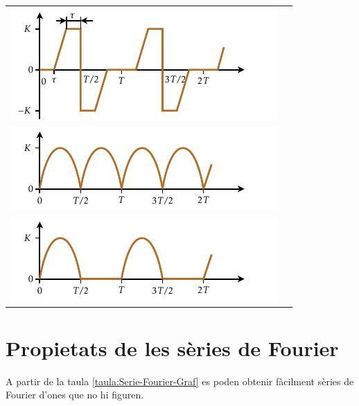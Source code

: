 \begin{longtable}{cc}
   \includegraphics{Imatges/Cap-Fourier-Funcio-12.pdf} & \raisebox{1.2cm}{$\displaystyle\frac{{2K}}{\piup }\sum\limits_{n = 1}^\infty  {\left( {1 + \frac{{\big(1 + ( - 1)^n \big)\sin (n\omega \tau )}}{{n(\piup  - 2\omega \tau )}}} \right)\frac{{( - 1)^{n+1} \sin (n\omega t)}}{n}}$}\\[2.4ex]
   \includegraphics{Imatges/Cap-Fourier-Funcio-13.pdf} & \raisebox{0.8cm}{$\displaystyle\frac{{2K}}{\piup } - \frac{{4K}}{\piup }\sum\limits_{n = 1}^\infty  {\frac{{\cos(2n\omega t)}}{{4n^2  - 1}}}$}\\[2.4ex]
   \includegraphics{Imatges/Cap-Fourier-Funcio-14.pdf} & \raisebox{0.8cm}{$\displaystyle\frac{K}{\piup } + \frac{K}{2}\sin (\omega t) - \frac{{2K}}{\piup }\sum\limits_{n = 1}^\infty  {\frac{{\cos (2n\omega t)}}{{4n^2  - 1}}}$}\\[2.4ex]
    \bottomrule[1pt]
\end{longtable}

\break

\section{Propietats de les s\`{e}ries de Fourier}

A partir de la taula \vref{taula:Serie-Fourier-Graf} es poden obtenir f\`{a}cilment s\`{e}ries de Fourier d'ones que no hi figuren.

